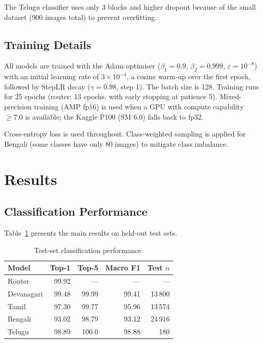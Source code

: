 \documentclass[10pt,twocolumn]{article}
\begin{document}
The Telugu classifier uses only 3 blocks and higher dropout because of the
small dataset (900 images total) to prevent overfitting.

\subsection{Training Details}

All models are trained with the Adam optimiser ($\beta_1=0.9$, $\beta_2=0.999$,
$\varepsilon=10^{-8}$) with an initial learning rate of $3\times10^{-4}$, a
cosine warm-up over the first epoch, followed by StepLR decay ($\gamma=0.98$,
step 1).  The batch size is 128.  Training runs for 25 epochs (router: 13
epochs, with early stopping at patience 5).  Mixed-precision training (AMP
fp16) is used when a GPU with compute capability $\geq7.0$ is available;
the Kaggle P100 (SM 6.0) falls back to fp32.

Cross-entropy loss is used throughout.  Class-weighted sampling is applied for
Bengali (some classes have only 80 images) to mitigate class imbalance.

\section{Results}

\subsection{Classification Performance}

Table~\ref{tab:main_results} presents the main results on held-out test sets.

\begin{table}[H]
\centering
\caption{Test-set classification performance.}
\label{tab:main_results}
\small
\begin{tabular}{lrrrr}
\toprule
Model & Top-1 & Top-5 & Macro F1 & Test $n$ \\
\midrule
Router          & 99.92 & —     & —     & — \\
Devanagari      & 99.48 & 99.99 & 99.41 & 13\,800 \\
Tamil           & 97.30 & 99.77 & 95.96 & 13\,574 \\
Bengali         & 93.02 & 98.79 & 93.12 & 24\,916 \\
Telugu          & 98.89 & 100.0 & 98.88 & 180 \\
\bottomrule
\end{tabular}
\end{table}
\end{document}
